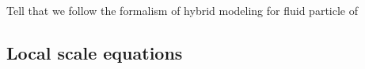 Tell that we follow the formalism of hybrid modeling for fluid particle of \citet{morel2015mathematical}

\subsection{Local scale equations}

